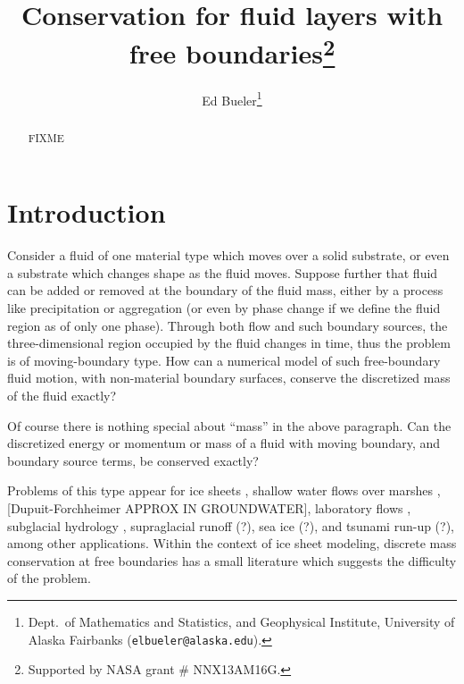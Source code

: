 \documentclass[final,leqno,onefignum,onetabnum]{siamltex1213bueler}
\title{Conservation for fluid layers with free boundaries\thanks{Supported by NASA grant \# NNX13AM16G.}}
\author{Ed Bueler\thanks{Dept.~of Mathematics and Statistics, and Geophysical Institute, University of Alaska Fairbanks (\texttt{elbueler@alaska.edu}).}}
\begin{document}
\maketitle
{}%

\begin{abstract}
FIXME
\end{abstract}




\pagestyle{myheadings}
\thispagestyle{plain}

\section{Introduction}

Consider a fluid of one material type which moves over a solid substrate, or even a substrate which changes shape as the fluid moves.  Suppose further that fluid can be added or removed at the boundary of the fluid mass, either by a process like precipitation or aggregation (or even by phase change if we define the fluid region as of only one phase).  Through both flow and such boundary sources, the three-dimensional region occupied by the fluid changes in time, thus the problem is of moving-boundary type.  How can a numerical model of such free-boundary fluid motion, with non-material boundary surfaces, conserve the discretized mass of the fluid exactly?

Of course there is nothing special about ``mass'' in the above paragraph.  Can the discretized energy or momentum or mass of a fluid with moving boundary, and boundary source terms, be conserved exactly?

Problems of this type appear for ice sheets \cite{BLKCB,CDDSV,EgholmNielsen2010,JouvetBueler2012}, shallow water flows over marshes \cite{AlonsoSantillanaDawson}, [Dupuit-Forchheimer APPROX IN GROUNDWATER], laboratory flows \cite{Kondic,PeglerWorster2012,SayagWorster2013}, subglacial hydrology \cite{AschwandenBuelerKhroulevBlatter,BuelervanPeltDRAFT,Schoofetal2012}, supraglacial runoff (?), sea ice (?), and tsunami run-up (?), among other applications.  Within the context of ice sheet modeling, discrete mass conservation at free boundaries has a small literature \cite{Albrechtetal2011,JaroschSchoofAnslow2013} which suggests the difficulty of the problem.
\end{document}
